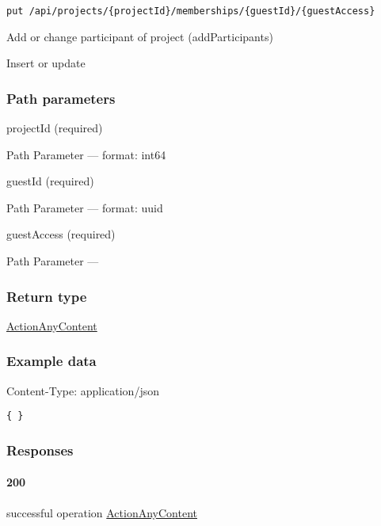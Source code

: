 
\protect\hypertarget{addParticipants}{}{}

\begin{verbatim}
put /api/projects/{projectId}/memberships/{guestId}/{guestAccess}
\end{verbatim}

Add or change participant of project ({addParticipants})

Insert or update

\hypertarget{path-parameters-2}{%
\subsubsection*{Path parameters}\label{path-parameters-2}}

projectId (required)

{Path Parameter} --- format: int64

guestId (required)

{Path Parameter} --- format: uuid

guestAccess (required)

{Path Parameter} ---

\hypertarget{return-type-4}{%
\subsubsection*{Return type}\label{return-type-4}}

\protect\hyperlink{ActionAnyContent}{ActionAnyContent}

\hypertarget{example-data-4}{%
\subsubsection*{Example data}\label{example-data-4}}

Content-Type: application/json

\begin{verbatim}
{ }
\end{verbatim}

\hypertarget{responses-4}{%
\subsubsection*{Responses}\label{responses-4}}

\hypertarget{section-14}{%
\paragraph{200}\label{section-14}}

successful operation
\protect\hyperlink{ActionAnyContent}{ActionAnyContent}


